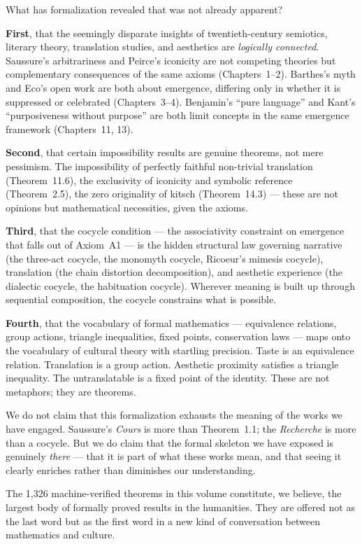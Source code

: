 \documentclass[11pt,oneside]{book}
\theoremstyle{plain}
\theoremstyle{definition}
\theoremstyle{remark}
\begin{document}
What has formalization revealed that was not already apparent?

\textbf{First}, that the seemingly disparate insights of twentieth-century
semiotics, literary theory, translation studies, and aesthetics are
\textit{logically connected}. Saussure's arbitrariness and Peirce's iconicity
are not competing theories but complementary consequences of the same axioms
(Chapters~1--2). Barthes's myth and Eco's open work are both about emergence,
differing only in whether it is suppressed or celebrated (Chapters~3--4).
Benjamin's ``pure language'' and Kant's ``purposiveness without purpose'' are
both limit concepts in the same emergence framework (Chapters~11, 13).

\textbf{Second}, that certain impossibility results are genuine theorems, not
mere pessimism. The impossibility of perfectly faithful non-trivial translation
(Theorem~11.6), the exclusivity of iconicity and symbolic reference
(Theorem~2.5), the zero originality of kitsch (Theorem~14.3) --- these are not
opinions but mathematical necessities, given the axioms.

\textbf{Third}, that the cocycle condition --- the associativity constraint on
emergence that falls out of Axiom~A1 --- is the hidden structural law governing
narrative (the three-act cocycle, the monomyth cocycle, Ricoeur's mimesis
cocycle), translation (the chain distortion decomposition), and aesthetic
experience (the dialectic cocycle, the habituation cocycle). Wherever meaning is
built up through sequential composition, the cocycle constrains what is possible.

\textbf{Fourth}, that the vocabulary of formal mathematics --- equivalence
relations, group actions, triangle inequalities, fixed points, conservation
laws --- maps onto the vocabulary of cultural theory with startling precision.
Taste is an equivalence relation. Translation is a group action. Aesthetic
proximity satisfies a triangle inequality. The untranslatable is a fixed point
of the identity. These are not metaphors; they are theorems.

We do not claim that this formalization exhausts the meaning of the works we
have engaged. Saussure's \textit{Cours} is more than Theorem~1.1; the
\textit{Recherche} is more than a cocycle. But we do claim that the formal
skeleton we have exposed is genuinely \textit{there} --- that it is part of
what these works mean, and that seeing it clearly enriches rather than diminishes
our understanding.

The 1,326 machine-verified theorems in this volume constitute, we believe, the
largest body of formally proved results in the humanities. They are offered not
as the last word but as the first word in a new kind of conversation between
mathematics and culture.
\end{document}
